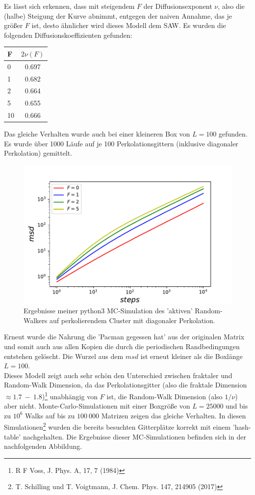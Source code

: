 \documentclass[a4paper, 12pt]{report}
\begin{document}
\noindent Es lässt sich erkennen, dass mit steigendem $F$ der Diffusionsexponent $\nu$, also die (halbe) Steigung der Kurve abnimmt, entgegen der naiven Annahme, das je größer $F$ ist, desto ähnlicher wird dieses Modell dem SAW.
Es wurden die folgenden Diffusionskoeffizienten gefunden:

\begin{tabular}[h]{l|c}
	F & $2\nu(F)$\\
	\hline
	0 & 0.697\\
	1 & 0.682\\
	2 & 0.664\\
	5 & 0.655\\
	10 & 0.666\\
\end{tabular}

\noindent Das gleiche Verhalten wurde auch bei einer kleineren Box von $L=100$ gefunden. Es wurde über 1000 Läufe auf je 100 Perkolationsgittern (inklusive diagonaler Perkolation) gemittelt.
\begin{figure}[h!]
	\centering
	\includegraphics[scale=0.9]{newfood.pdf}
	\caption{Ergebnisse meiner python3 MC-Simulation des 'aktiven' Random-Walkers auf perkolierendem Cluster mit diagonaler Perkolation.}
\end{figure}
\newpage 
\noindent Erneut wurde die Nahrung die 'Pacman gegessen hat' aus der originalen Matrix und somit auch aus allen Kopien die durch die periodischen Randbedingungen entstehen gelöscht. Die Wurzel aus dem $msd$ ist erneut kleiner als die Boxlänge $L=100$.\\
\noindent Dieses Modell zeigt auch sehr schön den Unterschied zwischen fraktaler und Random-Walk Dimension, da das Perkolationsgitter (also die fraktale Dimension $\approx 1.7\ -\ 1.8$)\footnote[9]{R F Voss, J. Phys. A, 17, 7 (1984)} unabhängig von $F$ ist, die Random-Walk Dimension (also $1/\nu$) aber nicht.
\newpage
\noindent Monte-Carlo-Simulationen mit einer Boxgröße von $L=25000$ und bis zu $10^6$ Walks auf bis zu $100\ 000$ Matrizen zeigen das gleiche Verhalten. In diesen Simulationen\footnote[8]{T. Schilling und T. Voigtmann, J. Chem. Phys. 147, 214905 (2017)} wurden die bereits besuchten Gitterplätze korrekt mit einem 'hash-table' nachgehalten. Die Ergebnisse dieser MC-Simulationen befinden sich in der nachfolgenden Abbildung.
\end{document}
